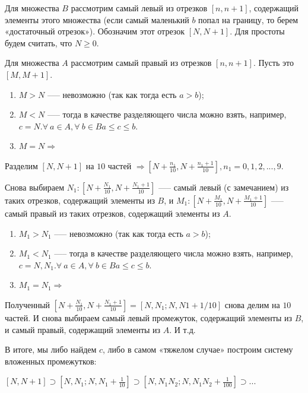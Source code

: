 \documentclass{article}
\begin{document}
        Для множества $B$ рассмотрим самый левый из отрезков $[n,n+1]$, содержащий элементы этого множества (если самый маленький $b$ попал на границу, то берем «достаточный отрезок»). Обозначим этот отрезок $[N,N+1]$. Для простоты будем считать, что $N \geq 0$.
        
        Для множества $A$ рассмотрим самый правый из отрезков $[n,n+1]$. Пусть это $[M,M+1]$. 

        \begin{enumerate}
            \item $M > N$ --— невозможно (так как тогда есть $a > b$);
            \item $M < N$ —-- тогда в качестве разделяющего числа можно взять, например, $c = N. \forall\ a \in A, \forall\ b \in B a \leq c \leq b$.
            \item $M = N \Rightarrow$ 
        \end{enumerate}

        Разделим $[N,N+1]$ на $10$ частей $\Rightarrow [N + \frac{n_1}{10},N + \frac{n_1 + 1}{10}], n_1 = 0,1,2,...,9$.

        Снова выбираем $N_1: [N + \frac{N_1}{10},N + \frac{N_1 + 1}{10}]$ —-- самый левый (с замечанием) из таких отрезков, содержащий элементы из $B$, и $M_1: [N + \frac{M_1}{10},N + \frac{M_1 + 1}{10}]$ --— самый правый из таких отрезков, содержащий элементы из $A$. 

        \begin{enumerate}
            \item $M_1 > N_1$ --— невозможно (так как тогда есть $a > b$);
            \item $M_1 < N_1$ —-- тогда в качестве разделяющего числа можно взять, например, $c = N,N_1. \forall\ a \in A, \forall\ b \in B a \leq c \leq b$.
            \item $M_1 = N_1 \Rightarrow$ 
        \end{enumerate}

        Полученный $[N + \frac{N_1}{10},N + \frac{N_1 + 1}{10}] = [N,N_1; N,N1+1/10]$ снова делим на $10$ частей. И снова выбираем самый левый промежуток, содержащий элементы из $B$, и самый правый, содержащий элементы из $A$. И т.д.

        В итоге, мы либо найдем $c$, либо в самом «тяжелом случае» построим систему вложенных промежутков: 

        $[N,N + 1] \supset [N,N_1; N,N_1 + \frac{1}{10}] \supset [N,N_1N_2; N,N_1N_2 + \frac{1}{100}] \supset ...$
\end{document}
